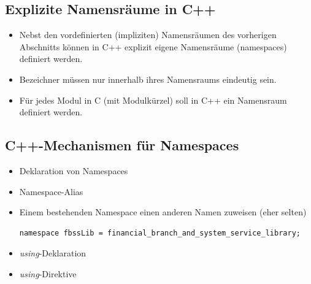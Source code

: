 \subsection{Explizite Namensräume in C++}
\begin{itemize}
	\item Nebst den vordefinierten (impliziten) Namensräumen des vorherigen Abschnitts können in C++ explizit eigene Namensräume (namespaces) definiert werden.
	\item Bezeichner müssen nur innerhalb ihres Namensraums eindeutig sein.
	\item Für jedes Modul in C (mit Modulkürzel) soll in C++ ein Namensraum definiert werden.
\end{itemize}

\subsection{C++-Mechanismen für Namespaces}
\begin{itemize}
	\item Deklaration von Namespaces
	\item Namespace-Alias
	\item[\-] Einem bestehenden Namespace einen anderen Namen zuweisen (eher selten)\\
\vspace{-\baselineskip}
\begin{minipage}{0.9\linewidth}
\begin{lstlisting}
namespace fbssLib = financial_branch_and_system_service_library;
\end{lstlisting}
\end{minipage}
	\item \emph{using}-Deklaration
	\item \emph{using}-Direktive
\end{itemize}

